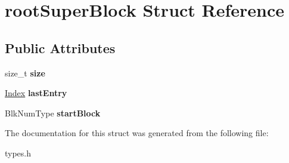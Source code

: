 \hypertarget{structrootSuperBlock}{}\section{root\+Super\+Block Struct Reference}
\label{structrootSuperBlock}
\subsection*{Public Attributes}
\begin{DoxyCompactItemize}
\item 
\mbox{\label{structrootSuperBlock_a346c6cd3ede82eb90190548d45c1789d}} 
size\+\_\+t {\bfseries size}
\item 
\mbox{\label{structrootSuperBlock_ac316fdcc2d2736d675980495d1732872}} 
\mbox{\hyperlink{structindex}{Index}} {\bfseries last\+Entry}
\item 
\mbox{\label{structrootSuperBlock_afb7d56b6d69b3f1555db0e3bce1d9612}} 
Blk\+Num\+Type {\bfseries start\+Block}
\end{DoxyCompactItemize}


The documentation for this struct was generated from the following file\+:\begin{DoxyCompactItemize}
\item 
types.\+h\end{DoxyCompactItemize}

